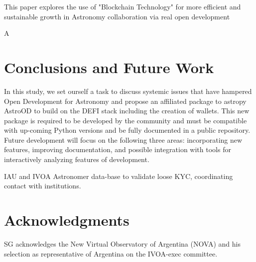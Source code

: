 \documentclass[final,5p,times,twocolumn,authoryear]{elsarticle}
\begin{document}
       
This paper explores the use of "Blockchain Technology" for more efficient and sustainable growth in Astronomy collaboration via real open development

A
\section{Conclusions and Future Work}
\label{sec:5}
%
In this study, we set ourself a task to discuss systemic issues that have hampered Open Development for Astronomy and propose an affiliated package to astropy AstroOD to build on the DEFI stack including the creation of wallets. This new package is required to be developed by the community and must be compatible with up-coming Python versions and be fully documented in a public repository. 
%
Future development will focus on the following three areas: incorporating
new features, improving documentation, and 
possible integration with tools for interactively analyzing features of development.

IAU and IVOA Astronomer data-base to validate loose KYC, coordinating contact with institutions. 

\section{Acknowledgments}
SG acknowledges the New Virtual Observatory of Argentina (NOVA) and his selection as representative of Argentina on the IVOA-exec committee.

%


\end{document}
